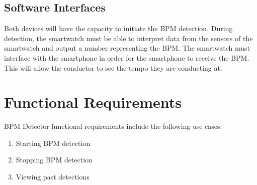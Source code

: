 \documentclass[12pt]{article}
\begin{document}
\subsection{Software Interfaces}
Both devices will have the capacity to initiate the BPM detection. During detection, the smartwatch must be able to interpret data from the sensors of the smartwatch and output a number representing the BPM. The smartwatch must interface with the smartphone in order for the smartphone to receive the BPM. This will allow the conductor to see the tempo they are conducting at.



\section{Functional Requirements}
BPM Detector functional requirements include the following use cases:
\begin{enumerate}
	\item Starting BPM detection
    \item Stopping BPM detection
    \item Viewing past detections
 \end{enumerate}
\end{document}
